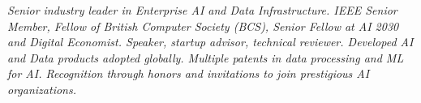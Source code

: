 {\selectfont
	\begin{justify}\textit{Senior industry leader in Enterprise AI and Data Infrastructure. IEEE Senior Member, Fellow of British Computer Society (BCS), Senior Fellow at AI 2030 and Digital Economist. Speaker, startup advisor, technical reviewer. Developed AI and Data products adopted globally. Multiple patents in data processing and ML for AI. Recognition through honors and invitations to join prestigious AI organizations.}\end{justify}
}